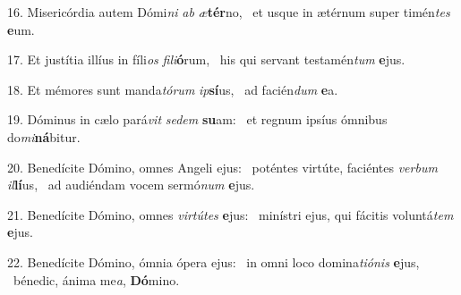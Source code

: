 16. Misericórdia autem Dómi\textit{ni} \textit{ab} \textit{æ}\textbf{tér}no, \ast\  et usque in ætérnum super timén\textit{tes} \textbf{e}um.\

17. Et justítia illíus in fíli\textit{os} \textit{fi}\textit{li}\textbf{ó}rum, \ast\  his qui servant testamén\textit{tum} \textbf{e}jus.\

18. Et mémores sunt manda\textit{tó}\textit{rum} \textit{ip}\textbf{sí}us, \ast\  ad facién\textit{dum} \textbf{e}a.\

19. Dóminus in cælo pará\textit{vit} \textit{se}\textit{dem} \textbf{su}am: \ast\  et regnum ipsíus ómnibus do\textit{mi}\textbf{ná}bitur.\

20. Benedícite Dómino, omnes Angeli ejus: \dag\  poténtes virtúte, faciéntes \textit{ver}\textit{bum} \textit{il}\textbf{lí}us, \ast\  ad audiéndam vocem sermó\textit{num} \textbf{e}jus.\

21. Benedícite Dómino, omnes \textit{vir}\textit{tú}\textit{tes} \textbf{e}jus: \ast\  minístri ejus, qui fácitis voluntá\textit{tem} \textbf{e}jus.\

22. Benedícite Dómino, ómnia ópera ejus: \dag\  in omni loco domina\textit{ti}\textit{ó}\textit{nis} \textbf{e}jus, \ast\  bénedic, ánima me\textit{a}, \textbf{Dó}mino.\


